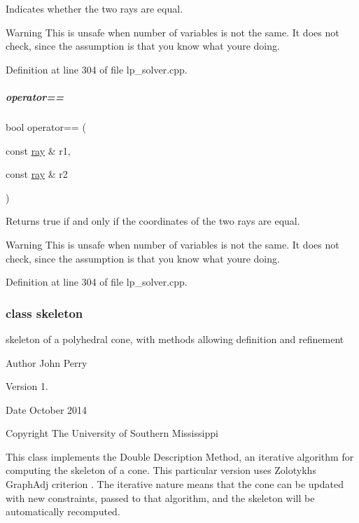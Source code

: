 Indicates whether the two rays are equal. 

\begin{DoxyWarning}{Warning}
This is unsafe when number of variables is not the same. It does not check, since the assumption is that you know what you\textquotesingle{}re doing. 
\end{DoxyWarning}


Definition at line 304 of file lp\+\_\+solver.\+cpp.

\mbox{\label{group___c_l_s_solvers_ae27bf49e1b2756797f82fea0bf810dfd}} 
\subparagraph{\texorpdfstring{operator==}{operator==}\hspace{0.1cm}{\footnotesize\ttfamily [2/2]}}
{\footnotesize\ttfamily bool operator== (\begin{DoxyParamCaption}\item[{const \hyperlink{group___c_l_s_solvers_classray}{ray} \&}]{r1,  }\item[{const \hyperlink{group___c_l_s_solvers_classray}{ray} \&}]{r2 }\end{DoxyParamCaption})\hspace{0.3cm}{\ttfamily [friend]}}



Returns {\ttfamily true} if and only if the coordinates of the two rays are equal. 

\begin{DoxyWarning}{Warning}
This is unsafe when number of variables is not the same. It does not check, since the assumption is that you know what you\textquotesingle{}re doing. 
\end{DoxyWarning}


Definition at line 304 of file lp\+\_\+solver.\+cpp.

\label{classskeleton}
\subsubsection{class skeleton}
skeleton of a polyhedral cone, with methods allowing definition and refinement 

\begin{DoxyAuthor}{Author}
John Perry 
\end{DoxyAuthor}
\begin{DoxyVersion}{Version}
1. 
\end{DoxyVersion}
\begin{DoxyDate}{Date}
October 2014 
\end{DoxyDate}
\begin{DoxyCopyright}{Copyright}
The University of Southern Mississippi
\end{DoxyCopyright}
This class implements the Double Description Method, an iterative algorithm for computing the skeleton of a cone. This particular version uses Zolotykh\textquotesingle{}s Graph\+Adj criterion \cite{Zolotych_DoubleDescription}. The iterative nature means that the cone can be updated with new constraints, passed to that algorithm, and the skeleton will be automatically recomputed. 

